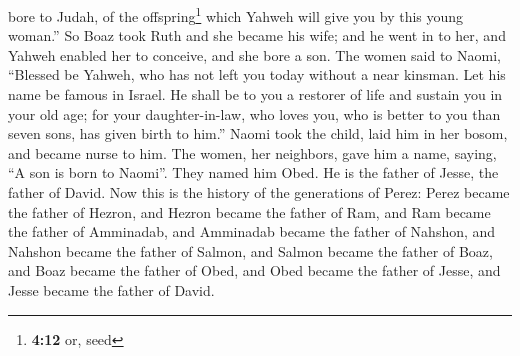 \begin{paracol}{2}
\begin{otherlanguage}{english}
bore to Judah, of the offspring\footnote{\textbf{4:12} or, seed} which
Yahweh will give you by this young woman.''  So Boaz took
Ruth and she became his wife; and he went in to her, and Yahweh enabled
her to conceive, and she bore a son.  The women said to
Naomi, ``Blessed be Yahweh, who has not left you today without a near
kinsman. Let his name be famous in Israel.  He shall be
to you a restorer of life and sustain you in your old age; for your
daughter-in-law, who loves you, who is better to you than seven sons,
has given birth to him.''  Naomi took the child, laid him
in her bosom, and became nurse to him.  The women, her
neighbors, gave him a name, saying, ``A son is born to Naomi''. They
named him Obed. He is the father of Jesse, the father of David.
 Now this is the history of the generations of Perez:
Perez became the father of Hezron,  and Hezron became the
father of Ram, and Ram became the father of Amminadab, 
and Amminadab became the father of Nahshon, and Nahshon became the
father of Salmon,  and Salmon became the father of Boaz,
and Boaz became the father of Obed,  and Obed became the
father of Jesse, and Jesse became the father of David.
\end{otherlanguage} \end{paracol}
